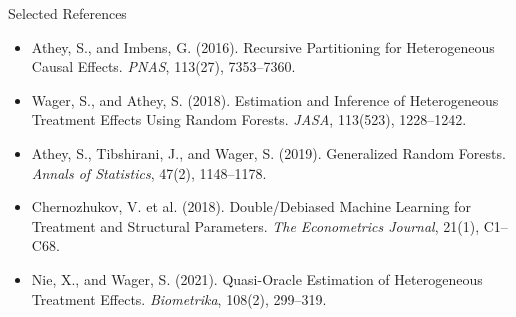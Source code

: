 \documentclass[aspectratio=169,11pt]{beamer}
\begin{document}
\begin{frame}{Selected References}
\small
\begin{itemize}
\item Athey, S., and Imbens, G. (2016). Recursive Partitioning for Heterogeneous Causal Effects. \textit{PNAS}, 113(27), 7353--7360.
\item Wager, S., and Athey, S. (2018). Estimation and Inference of Heterogeneous Treatment Effects Using Random Forests. \textit{JASA}, 113(523), 1228--1242.
\item Athey, S., Tibshirani, J., and Wager, S. (2019). Generalized Random Forests. \textit{Annals of Statistics}, 47(2), 1148--1178.
\item Chernozhukov, V. et al. (2018). Double/Debiased Machine Learning for Treatment and Structural Parameters. \textit{The Econometrics Journal}, 21(1), C1--C68.
\item Nie, X., and Wager, S. (2021). Quasi-Oracle Estimation of Heterogeneous Treatment Effects. \textit{Biometrika}, 108(2), 299--319.
\end{itemize}
\end{frame}

\contactslide
\end{document}

